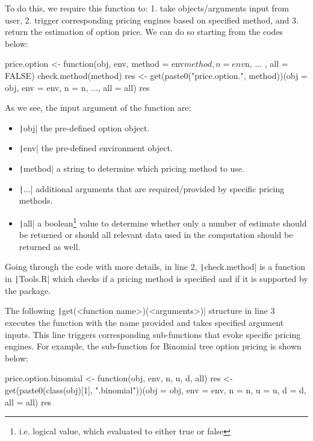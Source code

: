 To do this, we require this function to: 1. take objects/arguments input from user, 2. trigger corresponding pricing engines based on specified method, and 3. return the estimation of option price. We can do so starting from the codes below:

\begin{Rminted}
price.option <- function(obj, env, method = env$method, n = env$n, ... , all = FALSE) {
    check.method(method)
    res <- get(paste0("price.option.", method))(obj = obj, env = env, n = n, ..., all = all)
    res
}
\end{Rminted}

As we see, the input argument of the function are:

\begin{itemize}
    \item \texttt|obj| the pre-defined option object.
    \item \texttt|env| the pre-defined environment object.
    \item \texttt|method| a string to determine which pricing method to use.
    \item \texttt|...| additional arguments that are required/provided by specific pricing methods.
    \item \texttt|all| a boolean\footnote{i.e. logical value, which evaluated to either true or false} value to determine whether only a number of estimate should be returned or should all relevant data used in the computation should be returned as well.
\end{itemize}

Going through the code with more details, in line 2, \texttt|check.method| is a function in \texttt|Tools.R| which checks if a pricing method is specified and if it is supported by the package.

The following \texttt|get(<function name>)(<arguments>)| structure in line 3 executes the function with the name provided and takes specified argument inputs. This line triggers corresponding sub-functions that evoke specific pricing engines. For example, the sub-function for Binomial tree option pricing is shown below:

\begin{Rminted}
price.option.binomial <- function(obj, env, n, u, d, all) {
    res <- get(paste0(class(obj)[1], ".binomial"))(obj = obj, env = env, n = n, u = u, d = d, all = all)
    res
}
\end{Rminted}

